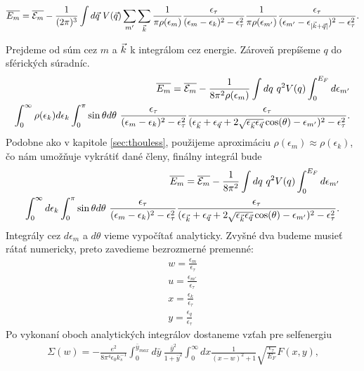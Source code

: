 \begin{align}
\label{eq:05energy3}
\overline{E_m}=\overline{\mathcal{E}_m} - \frac{1}{(2\pi)^3} \int d\vec{q}\ V(\vec{q}) \sum_{m'}\sum_{\vec{k}}\frac{1}{\pi\rho(\epsilon_m)}\frac{\epsilon_\tau}{(\epsilon_m-\epsilon_k)^2-\epsilon_\tau^2}\frac{1}{\pi\rho(\epsilon_{m'})}\frac{\epsilon_\tau}{(\epsilon_{m'}-\epsilon_{|\vec{k}+\vec{q}|})^2-\epsilon_\tau^2} \text{.}
\end{align}

Prejdeme od súm cez $m$ a $\vec{k}$ k integrálom cez energie. Zároveň prepíšeme $q$ do sférických súradníc. 
\begin{align}
\label{eq:05energy4}
\notag
\overline{E_m}=\overline{\E_m} - \frac{1}{8\pi^2\rho(\epsilon_m)} \int dq\ q^2 V(q) \int_0^{E_F} d\epsilon_{m'} \\
\int_0^{\infty} \rho(\epsilon_k) d \epsilon_k \int_0^\pi \sin\theta d\theta\ \frac{\epsilon_\tau}{(\epsilon_m-\epsilon_k)^2-\epsilon_\tau^2}\frac{\epsilon_\tau}{(\epsilon_{\vk}+\epsilon_{\vq}+2\sqrt{\epsilon_{\vk}\epsilon_{\vq}}\cos(\theta)-\epsilon_{m'})^2-\epsilon_\tau^2} \text{.} 
\end{align}
Podobne ako v kapitole \ref{sec:thouless}, použijeme aproximáciu $\rho(\epsilon_m)\approx\rho(\epsilon_k)$, čo nám umožňuje vykrátiť dané členy, finálny integrál bude
\begin{align}
\label{eq:05energy5}
\notag
\overline{E_m}=\overline{\mathcal{E}_m} - \frac{1}{8\pi^2} \int dq\ q^2 V(q) \int_0^{E_F} d\epsilon_{m'} \\
\int_0^{\infty} d \epsilon_k  \int_0^\pi \sin\theta d\theta\  \frac{\epsilon_\tau}{(\epsilon_m-\epsilon_k)^2-\epsilon_\tau^2}\frac{\epsilon_\tau}{(\epsilon_{\vec{k}}+\epsilon_{\vec{q}}+2\sqrt{\epsilon_{\vec{k}}\epsilon_{\vec{q}}}\cos(\theta)-\epsilon_{m'})^2-\epsilon_\tau^2} \text{.} 
\end{align}
Integrály cez $d\epsilon_m$ a $d\theta$ vieme vypočítať analyticky. Zvyšné dva budeme musieť rátať numericky, preto zavedieme bezrozmerné premenné:
\begin{align*}
w=\frac{\epsilon_m}{\epsilon_\tau} \\
u=\frac{\epsilon_{m'}}{\epsilon_\tau} \\
x=\frac{\epsilon_k}{\epsilon_\tau} \\
y=\frac{\epsilon_q}{\epsilon_\tau} 
\end{align*}
Po vykonaní oboch analytických integrálov dostaneme vzťah pre selfenergiu
\begin{align}
\label{eq:05selfenergy}
\Sigma(w)=-\frac{e^2}{8\pi^4\epsilon_0 k_s^{-1}} \int_0^{\bar y_{max}} d\bar{y}\ \frac{\bar{y}^2}{1+\bar{y}^2}\int_0^{\infty} dx \frac{1}{(x-w)^2+1}\sqrt{\frac{\epsilon_\tau}{E_F}}F(x,y) \text{,}
\end{align}
